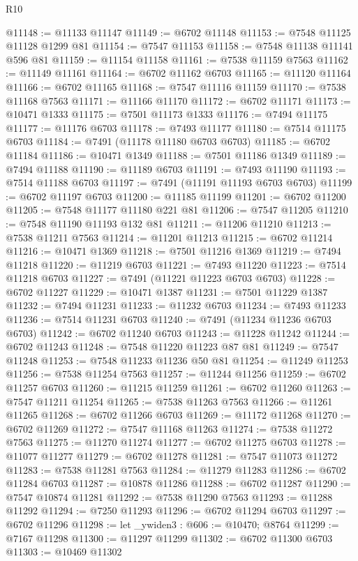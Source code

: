 \begin{lexlean}{R10}
\begin{coremodule}
@11148 := @11133 @11147
@11149 := @6702 @11148
@11153 := @7548 @11125 @11128 @1299 @81
@11154 := @7547 @11153
@11158 := @7548 @11138 @11141 @596 @81
@11159 := @11154 @11158
@11161 := @7538 @11159 @7563
@11162 := @11149 @11161
@11164 := @6702 @11162 @6703
@11165 := @11120 @11164
@11166 := @6702 @11165
@11168 := @7547 @11116 @11159
@11170 := @7538 @11168 @7563
@11171 := @11166 @11170
@11172 := @6702 @11171
@11173 := @10471 @1333
@11175 := @7501 @11173 @1333
@11176 := @7494 @11175
@11177 := @11176 @6703
@11178 := @7493 @11177
@11180 := @7514 @11175 @6703
@11184 := @7491 (@11178 @11180 @6703 @6703)
@11185 := @6702 @11184
@11186 := @10471 @1349
@11188 := @7501 @11186 @1349
@11189 := @7494 @11188
@11190 := @11189 @6703
@11191 := @7493 @11190
@11193 := @7514 @11188 @6703
@11197 := @7491 (@11191 @11193 @6703 @6703)
@11199 := @6702 @11197 @6703
@11200 := @11185 @11199
@11201 := @6702 @11200
@11205 := @7548 @11177 @11180 @221 @81
@11206 := @7547 @11205
@11210 := @7548 @11190 @11193 @132 @81
@11211 := @11206 @11210
@11213 := @7538 @11211 @7563
@11214 := @11201 @11213
@11215 := @6702 @11214
@11216 := @10471 @1369
@11218 := @7501 @11216 @1369
@11219 := @7494 @11218
@11220 := @11219 @6703
@11221 := @7493 @11220
@11223 := @7514 @11218 @6703
@11227 := @7491 (@11221 @11223 @6703 @6703)
@11228 := @6702 @11227
@11229 := @10471 @1387
@11231 := @7501 @11229 @1387
@11232 := @7494 @11231
@11233 := @11232 @6703
@11234 := @7493 @11233
@11236 := @7514 @11231 @6703
@11240 := @7491 (@11234 @11236 @6703 @6703)
@11242 := @6702 @11240 @6703
@11243 := @11228 @11242
@11244 := @6702 @11243
@11248 := @7548 @11220 @11223 @87 @81
@11249 := @7547 @11248
@11253 := @7548 @11233 @11236 @50 @81
@11254 := @11249 @11253
@11256 := @7538 @11254 @7563
@11257 := @11244 @11256
@11259 := @6702 @11257 @6703
@11260 := @11215 @11259
@11261 := @6702 @11260
@11263 := @7547 @11211 @11254
@11265 := @7538 @11263 @7563
@11266 := @11261 @11265
@11268 := @6702 @11266 @6703
@11269 := @11172 @11268
@11270 := @6702 @11269
@11272 := @7547 @11168 @11263
@11274 := @7538 @11272 @7563
@11275 := @11270 @11274
@11277 := @6702 @11275 @6703
@11278 := @11077 @11277
@11279 := @6702 @11278
@11281 := @7547 @11073 @11272
@11283 := @7538 @11281 @7563
@11284 := @11279 @11283
@11286 := @6702 @11284 @6703
@11287 := @10878 @11286
@11288 := @6702 @11287
@11290 := @7547 @10874 @11281
@11292 := @7538 @11290 @7563
@11293 := @11288 @11292
@11294 := @7250 @11293
@11296 := @6702 @11294 @6703
@11297 := @6702 @11296
@11298 := let _ywiden3 : @606 := @10470; @8764
@11299 := @7167 @11298
@11300 := @11297 @11299
@11302 := @6702 @11300 @6703
@11303 := @10469 @11302

\end{coremodule}
\end{lexlean}
